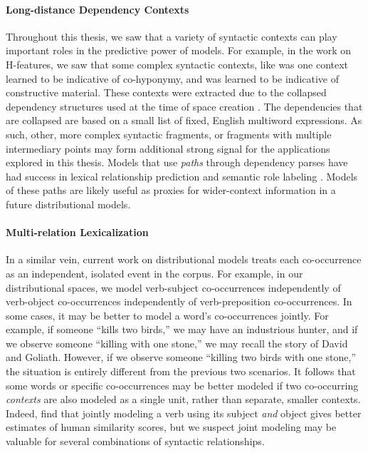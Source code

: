 \paragraph{Long-distance Dependency Contexts}
Throughout this thesis, we saw that a variety of syntactic contexts can play
important roles in the predictive power of models. For example, in the work on
H-features, we saw that some complex syntactic contexts, like
 was one context learned to be indicative of
co-hyponymy, and  was learned to be indicative
of constructive material. These contexts were extracted due to the collapsed
dependency structures used at the time of space creation
\cite{marneffe:2008:techreport}. The dependencies that are collapsed are
based on a small list of fixed, English multiword expressions. As such,
other, more complex syntactic fragments, or fragments with multiple
intermediary points may form additional strong signal for the applications
explored in this thesis. Models that use {\em paths} through dependency
parses have had success in lexical relationship prediction
\cite{shwartz:2016:acl,shwartz:2016:cogalex2} and semantic role labeling
\cite{roth:2016:acl}. Models of these paths are likely useful as proxies for
wider-context information in a future distributional models.

\paragraph{Multi-relation Lexicalization}
In a similar vein, current work on distributional models treats each
co-occurrence as an independent, isolated event in the corpus. For example, in
our distributional spaces, we model verb-subject co-occurrences independently
of verb-object co-occurrences independently of verb-preposition co-occurrences.
In some cases, it may be better to model a word's co-occurrences jointly. For
example, if someone ``kills two birds,'' we may have an industrious hunter, and
if we observe someone ``killing with one stone,'' we may recall the story of
David and Goliath. However, if we observe someone ``killing two birds with one
stone,'' the situation is entirely different from the previous two scenarios.
It follows that some words or specific co-occurrences may be better modeled
if two co-occurring {\em contexts} are also modeled as a single unit, rather
than separate, smaller contexts.
Indeed,  find that jointly modeling a verb using
its subject {\em and} object gives better estimates of human similarity
scores, but we suspect joint modeling may be valuable for several combinations
of syntactic relationships.

